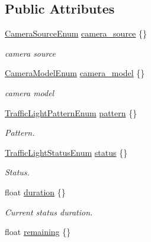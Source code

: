 \subsection*{Public Attributes}
\begin{DoxyCompactItemize}
\item 
\hyperlink{structmaf__perception__interface_1_1CameraSourceEnum}{Camera\+Source\+Enum} \hyperlink{structmaf__perception__interface_1_1TrafficLightDecision_a3a37c0f3c8089d8c619170cad62908ac}{camera\+\_\+source} \{\}
\begin{DoxyCompactList}\small\item\em camera source \end{DoxyCompactList}\item 
\hyperlink{structmaf__perception__interface_1_1CameraModelEnum}{Camera\+Model\+Enum} \hyperlink{structmaf__perception__interface_1_1TrafficLightDecision_a67c958a0a1421fe628ad70baed1baa45}{camera\+\_\+model} \{\}
\begin{DoxyCompactList}\small\item\em camera model \end{DoxyCompactList}\item 
\hyperlink{structmaf__perception__interface_1_1TrafficLightPatternEnum}{Traffic\+Light\+Pattern\+Enum} \hyperlink{structmaf__perception__interface_1_1TrafficLightDecision_a19d525d1385ad65aef19a3f523f8c3b2}{pattern} \{\}
\begin{DoxyCompactList}\small\item\em Pattern. \end{DoxyCompactList}\item 
\hyperlink{structmaf__perception__interface_1_1TrafficLightStatusEnum}{Traffic\+Light\+Status\+Enum} \hyperlink{structmaf__perception__interface_1_1TrafficLightDecision_addd40ff23d63840256c19737a3dfe0be}{status} \{\}
\begin{DoxyCompactList}\small\item\em Status. \end{DoxyCompactList}\item 
float \hyperlink{structmaf__perception__interface_1_1TrafficLightDecision_a2cf5ec4c5d3f203b59ee93da9d106e18}{duration} \{\}
\begin{DoxyCompactList}\small\item\em Current status duration. \end{DoxyCompactList}\item 
float \hyperlink{structmaf__perception__interface_1_1TrafficLightDecision_abadc68c6b903948180c738893e6e8713}{remaining} \{\}

\end{DoxyCompactItemize}
